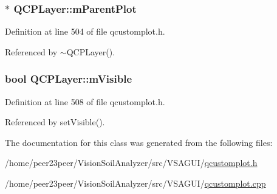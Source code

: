 \subsubsection[{m\+Parent\+Plot}]{$\ast$ Q\+C\+P\+Layer\+::m\+Parent\+Plot\hspace{0.3cm}{\ttfamily [protected]}}\label{class_q_c_p_layer_a2f3374a7884bf403720cd1cf6f7ad1bb}


Definition at line 504 of file qcustomplot.\+h.



Referenced by $\sim$\+Q\+C\+P\+Layer().

\hypertarget{class_q_c_p_layer_a264950deb08e589460c126c895a1e2b5}{}
\subsubsection[{m\+Visible}]{\setlength{\rightskip}{0pt plus 5cm}bool Q\+C\+P\+Layer\+::m\+Visible\hspace{0.3cm}{\ttfamily [protected]}}\label{class_q_c_p_layer_a264950deb08e589460c126c895a1e2b5}


Definition at line 508 of file qcustomplot.\+h.



Referenced by set\+Visible().



The documentation for this class was generated from the following files\+:\begin{DoxyCompactItemize}
\item 
/home/peer23peer/\+Vision\+Soil\+Analyzer/src/\+V\+S\+A\+G\+U\+I/\hyperlink{qcustomplot_8h}{qcustomplot.\+h}\item 
/home/peer23peer/\+Vision\+Soil\+Analyzer/src/\+V\+S\+A\+G\+U\+I/\hyperlink{qcustomplot_8cpp}{qcustomplot.\+cpp}\end{DoxyCompactItemize}
